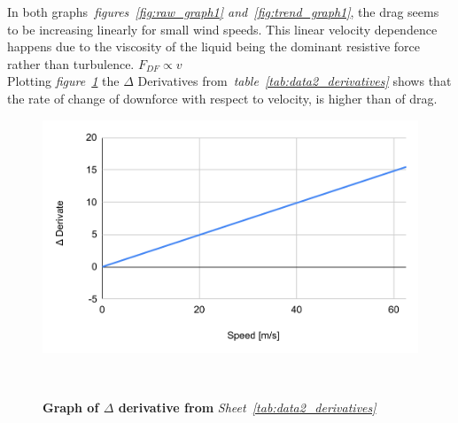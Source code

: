 \documentclass[11pt, a4paper]{article}
\begin{document}
In both graphs~\textit{figures~\ref{fig:raw_graph1} and~\ref{fig:trend_graph1}}, the drag seems to be increasing linearly for small wind speeds. 
This linear velocity dependence happens due to the viscosity of the liquid being the dominant resistive force rather than turbulence. $F_{DF}\propto v$
~\cite{4}
\\
Plotting \textit{figure~\ref{fig:der_graph1}} the $\Delta$ Derivatives from~\textit{table~\ref{tab:data2_derivatives}} shows that the rate of change of downforce with respect to velocity, is higher than of drag.
\begin{figure}[H]
    \centering
    \caption{\textbf{Graph of $\Delta$ derivative from }\textit{Sheet~\ref{tab:data2_derivatives}}}
    \includegraphics[width=\textwidth]{graphs/D_Der_Speed.pdf}
    
~\label{fig:der_graph1}
\end{figure}
\end{document}
